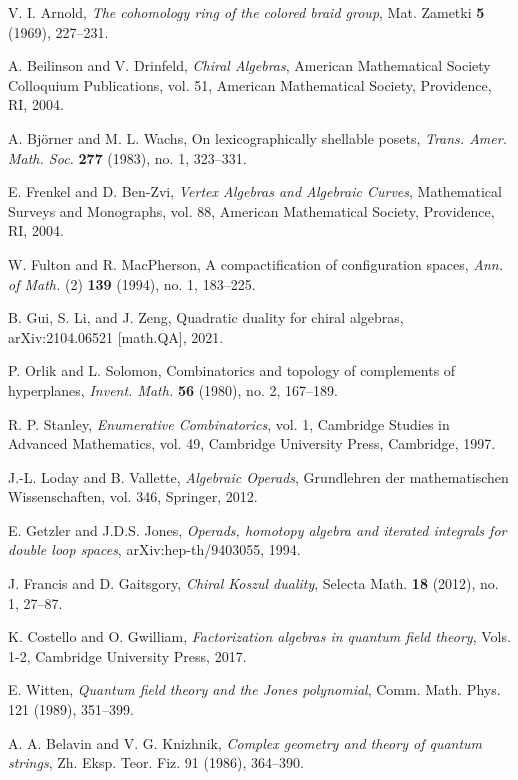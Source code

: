 \begin{thebibliography}{99}

V. I. Arnold, \emph{The cohomology ring of the colored braid group}, 
Mat. Zametki \textbf{5} (1969), 227--231.

 A. Beilinson and V. Drinfeld, \emph{Chiral Algebras}, American Mathematical Society Colloquium Publications, vol. 51, American Mathematical Society, Providence, RI, 2004.
 
 A. Björner and M. L. Wachs, On lexicographically shellable posets, \emph{Trans. Amer. Math. Soc.} \textbf{277} (1983), no. 1, 323--331.
 
 E. Frenkel and D. Ben-Zvi, \emph{Vertex Algebras and Algebraic Curves}, Mathematical Surveys and Monographs, vol. 88, American Mathematical Society, Providence, RI, 2004.
 
 W. Fulton and R. MacPherson, A compactification of configuration spaces, \emph{Ann. of Math.} (2) \textbf{139} (1994), no. 1, 183--225.
 
 B. Gui, S. Li, and J. Zeng, Quadratic duality for chiral algebras, arXiv:2104.06521 [math.QA], 2021.
 
 P. Orlik and L. Solomon, Combinatorics and topology of complements of hyperplanes, \emph{Invent. Math.} \textbf{56} (1980), no. 2, 167--189.
 
 R. P. Stanley, \emph{Enumerative Combinatorics}, vol. 1, Cambridge Studies in Advanced Mathematics, vol. 49, Cambridge University Press, Cambridge, 1997.

 J.-L. Loday and B. Vallette, \emph{Algebraic Operads}, Grundlehren der mathematischen Wissenschaften, vol. 346, Springer, 2012.

 E. Getzler and J.D.S. Jones, \emph{Operads, homotopy algebra and iterated integrals for double loop spaces}, arXiv:hep-th/9403055, 1994.

 J. Francis and D. Gaitsgory, \emph{Chiral Koszul duality}, Selecta Math. \textbf{18} (2012), no. 1, 27--87.

 K. Costello and O. Gwilliam, \emph{Factorization algebras in quantum field theory}, Vols. 1-2, Cambridge University Press, 2017.

 E. Witten, \emph{Quantum field theory and the Jones polynomial}, 
  Comm. Math. Phys. 121 (1989), 351--399.

 A. A. Belavin and V. G. Knizhnik, \emph{Complex geometry and theory of quantum strings}, 
  Zh. Eksp. Teor. Fiz. 91 (1986), 364--390.
  

\end{thebibliography}
